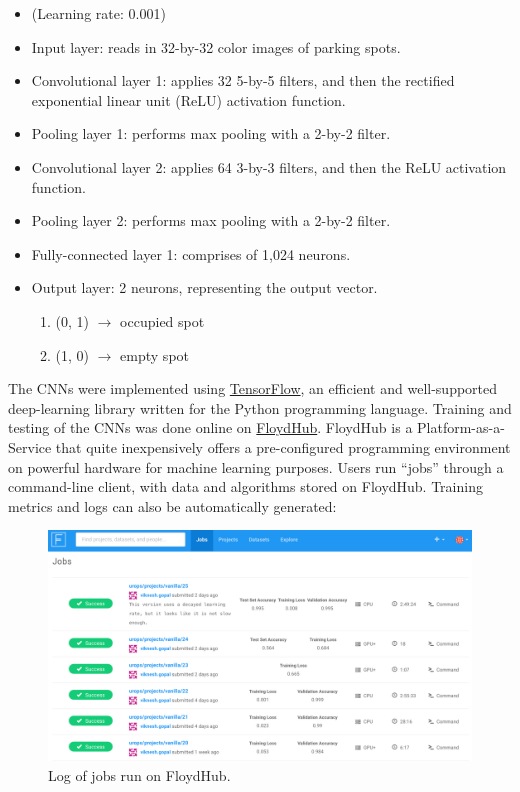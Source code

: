 \documentclass[a4paper, 11pt]{article} %
\begin{document}
	\begin{itemize}
		\setlength\itemsep{-3mm}
		\item[] (Learning rate: 0.001)
		\item[] Input layer: reads in 32-by-32 color images of parking spots.
		\item[] Convolutional layer 1: applies 32 5-by-5 filters, and then the 
		rectified exponential linear unit (ReLU) activation function.
		\item[] Pooling layer 1: performs max pooling with a 2-by-2 filter.
		\item[] Convolutional layer 2: applies 64 3-by-3 filters, and then the 
		ReLU activation function.
		\item[] Pooling layer 2: performs max pooling with a 2-by-2 filter.
		\item[] Fully-connected layer 1: comprises of 1,024 neurons.
		\item[] Output layer: 2 neurons, representing the output vector.
		\vspace*{-4mm}
		\begin{enumerate}
			\setlength\itemsep{-3mm}
			\item[] (0, 1) $\rightarrow$ occupied spot
			\item[] (1, 0) $\rightarrow$ empty spot
		\end{enumerate}
	\end{itemize}
   	The CNNs were implemented using 
   	\href{https://www.tensorflow.org}{TensorFlow}, an efficient and 
   	well-supported deep-learning library written for the Python programming language. Training and 
   	testing of the CNNs was done online on \href{https://www.floydhub.com}{FloydHub}. FloydHub is a 
   	Platform-as-a-Service that quite inexpensively offers a pre-configured programming environment on 
   	powerful hardware for machine learning purposes. Users run ``jobs'' through a command-line client, 
   	with data and algorithms stored on FloydHub. Training metrics and logs can also be automatically 
    generated:
    \vskip 5mm
    \begin{figure}[H]
    	\centering
    	\includegraphics[width=14cm]{figures/floydhub.png}
    	\caption{Log of jobs run on FloydHub.}
    \end{figure}
\end{document}
